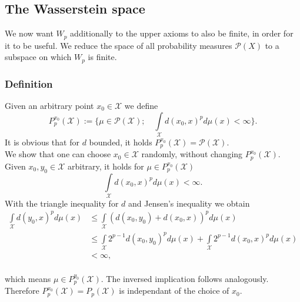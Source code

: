 \documentclass[11pt,a4paper]{article}
\begin{document}
\subsection{The Wasserstein space}
We now want $W_p$ additionally to the upper axioms to also be finite, in order for it to be useful. We reduce the space of all probability measures $\mathcal{P}(X)$ to a subspace on which $W_p$ is finite.
\subsubsection{Definition}
Given an arbitrary point $x_0\in\mathcal{X}$ we define
\[
P^{x_0}_p(\mathcal{X}):=\bigg\lbrace{}\mu\in\mathcal{P(X)};\quad \int\limits_{\mathcal{X}} d(x_0,x)^p d\mu(x)<\infty\bigg\rbrace.
\]
It is obvious that for $d$ bounded, it holds $P^{x_0}_p(\mathcal{X})=\mathcal{P(X)}$.\vspace{1em}\\We show that one can choose $x_0\in\mathcal{X}$ randomly, without changing $P^{x_0}_p(\mathcal{X})$.\\
Given $x_0,y_0\in\mathcal{X}$ arbitrary, it holds for $\mu\in{}P^{x_0}_p(\mathcal{X})$
\[
\int\limits_{\mathcal{X}}d(x_0,x)^pd\mu(x)<\infty.
\]
With the triangle inequality for $d$ and Jensen's inequality we obtain\vspace{1em}\\
\begin{align*}
\int\limits_{\mathcal{X}}d(y_0,x)^pd\mu(x)&\leq\int\limits_{\mathcal{X}}(d(x_0,y_0)+d(x_0,x))^pd\mu(x)\\&\leq\int\limits_{\mathcal{X}}2^{p-1}d(x_0,y_0)^pd\mu(x) + \int\limits_{\mathcal{X}}2^{p-1}d(x_0,x)^pd\mu(x)\\&<\infty,
\end{align*}
\vspace{1em}\\
which means $\mu\in{}P^{y_0}_p(\mathcal{X})$. The inversed implication follows analogously. Therefore $P^{x_0}_p(\mathcal{X})=P_p(\mathcal{X})$ is independant of the choice of $x_0.$
\end{document}
